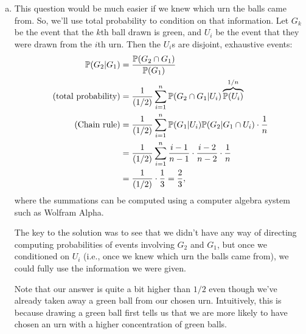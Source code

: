 \documentclass[12pt]{article}
\begin{document}
{\begin{enumerate}[(a)]
            Since the urns all have an equal number of balls, randomly choosing
            an urn and then randomly choosing a ball is equivalent to randomly
            choosing a ball from all the balls (convince yourself that this is
            true!). So, the probability is $1/2$. This answer should also make
            intuitive sense: since red and green are completely symmetric here,
            the answer should be the same for red as it is for green: the only
            way for that to be true is for both to be $1/2$.
        \item This question would be much easier if we knew which urn the balls
            came from. So, we'll use total probability to condition on that information. Let
            $G_k$ be the event that the $k$th ball drawn is green, and $U_i$ be the
            event that they were drawn from the $i$th urn. Then the $U_i$s are
            disjoint, exhaustive events:
            \begin{align*}
                \P(G_2 | G_1) &= \frac{\P(G_2 \cap G_1)}{\P(G_1)} \\
                    \text{(total probability)} 
                        &= \frac{1}{(1/2)} \sum_{i=1}^n \P(G_2 \cap G_1 | U_i)\overbrace{\P(U_i)}^{1/n} \\
                    \text{(Chain rule)} 
                        &= \frac{1}{(1/2)} \sum_{i=1}^n \P(G_1|U_i)\P(G_2|G_1 \cap U_i) \cdot \frac{1}{n} \\
                        &= \frac{1}{(1/2)} \sum_{i=1}^n \frac{i-1}{n-1} \cdot \frac{i-2}{n-2} \cdot \frac{1}{n} \\
                        &= \frac{1}{(1/2)} \cdot \frac{1}{3} = \frac{2}{3},
            \end{align*}
            where the summations can be computed using a computer algebra
            system such as Wolfram Alpha.

            The key to the solution was to see that we didn't have any way of
            directing computing probabilities of events involving $G_2$ and $G_1$, but
            once we conditioned on $U_i$ (i.e., once we knew which urn the balls came from),
            we could fully use the information we were given.

            Note that our answer is quite a bit higher than $1/2$ even though
            we've already taken away a green ball from our chosen urn.
            Intuitively, this is because drawing a green ball first tells us
            that we are more likely to have chosen an urn with a higher
            concentration of green balls.
    \end{enumerate}
    }
\end{document}
